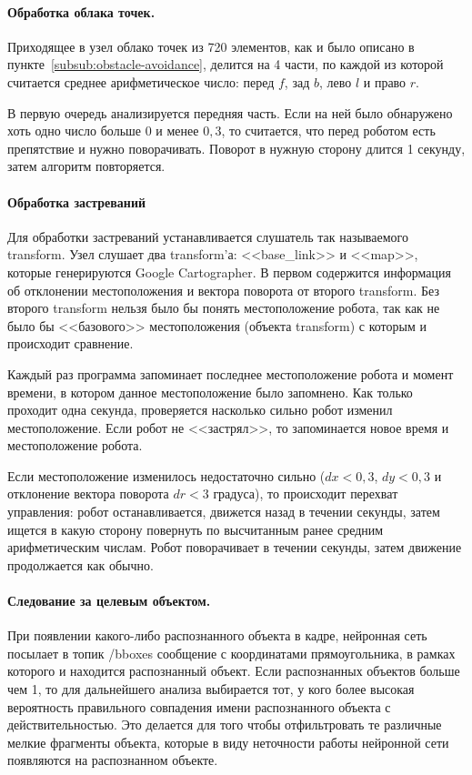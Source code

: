 \paragraph{Обработка облака точек.} Приходящее в узел облако точек из 720 элементов, как и было описано в пункте~\ref{subsub:obstacle-avoidance}, делится на 4 части, по каждой из которой считается среднее арифметическое число: перед $f$, зад $b$, лево $l$ и право $r$. 

В первую очередь анализируется передняя часть. Если на ней было обнаружено хоть одно число больше $0$ и менее $0,3$, то считается, что перед роботом есть препятствие и нужно поворачивать. Поворот в нужную сторону длится 1 секунду, затем алгоритм повторяется.

\paragraph{Обработка застреваний}
Для обработки застреваний устанавливается слушатель так называемого transform. Узел слушает два transform'а: <<base\_link>> и <<map>>, которые генерируются Google Cartographer. В первом содержится информация об отклонении местоположения и вектора поворота от второго transform. Без второго transform нельзя было бы понять местоположение робота, так как не было бы <<базового>> местоположения (объекта transform) с которым и происходит сравнение. 

Каждый раз программа запоминает последнее местоположение робота и момент времени, в котором данное местоположение было запомнено. Как только проходит одна секунда, проверяется насколько сильно робот изменил местоположение. Если робот не <<застрял>>, то запоминается новое время и местоположение робота. 

Если местоположение изменилось недостаточно сильно ($dx < 0,3$, $dy < 0,3$ и отклонение вектора поворота $dr < 3$ градуса), то происходит перехват управления: робот останавливается, движется назад в течении секунды, затем ищется в какую сторону повернуть по высчитанным ранее средним арифметическим числам. Робот поворачивает в течении секунды, затем движение продолжается как обычно. 

\paragraph{Следование за целевым объектом.} При появлении какого-либо распознанного объекта в кадре, нейронная сеть посылает в топик /bboxes сообщение с координатами прямоугольника, в рамках которого и находится распознанный объект. Если распознанных объектов больше чем 1, то для дальнейшего анализа выбирается тот, у кого более высокая вероятность правильного совпадения имени распознанного объекта с действительностью. Это делается для того чтобы отфильтровать те различные мелкие фрагменты объекта, которые в виду неточности работы нейронной сети появляются на распознанном объекте.

